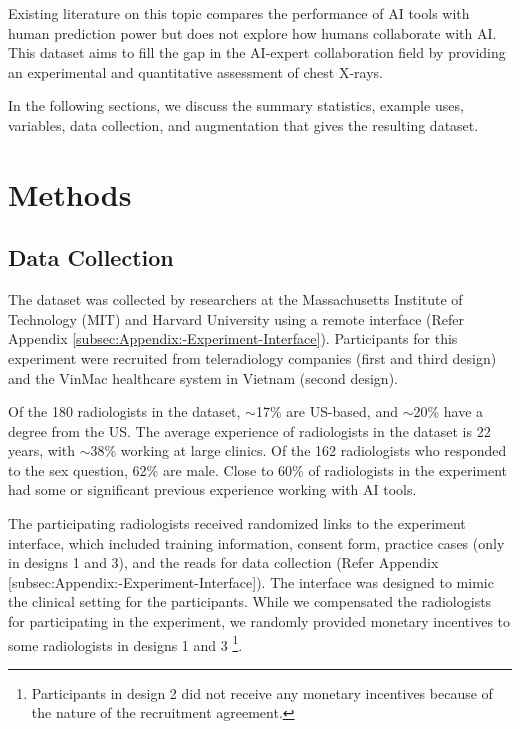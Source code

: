 \documentclass[fleqn,10pt]{wlscirep}
\begin{document}
Existing literature on this topic compares the performance of AI tools with human prediction power but does not explore how humans collaborate with AI. This dataset aims to fill the gap in the AI-expert collaboration field by providing an experimental and quantitative assessment of chest X-rays.

In the following sections, we discuss the summary statistics, example uses, variables, data collection, and augmentation that gives the resulting dataset. 



\section*{Methods}

\subsection*{Data Collection}

The dataset was collected by researchers at the Massachusetts Institute of Technology (MIT) and Harvard University using a remote interface (Refer Appendix \ref{subsec:Appendix:-Experiment-Interface}). Participants for this experiment were recruited from teleradiology companies (first and third design) and the VinMac healthcare system in Vietnam (second design).

Of the 180 radiologists in the dataset, $\sim$17\% are US-based, and $\sim$20\% have a degree from the US. The average experience of radiologists in the dataset is 22 years, with $\sim$38\% working at large clinics. Of the 162 radiologists who responded to the sex question, 62\% are male. Close to 60\% of radiologists in the experiment had some or significant previous experience working with AI tools. 

The participating radiologists received randomized links to the experiment interface, which included training information, consent form, practice cases (only in designs 1 and 3), and the reads for data collection (Refer Appendix [subsec:Appendix:-Experiment-Interface]). The interface was designed to mimic the clinical setting for the participants. While we compensated the radiologists for participating in the experiment, we randomly provided monetary incentives to some radiologists in designs 1 and 3 \footnote{Participants in design 2 did not receive any monetary incentives because of the nature of the recruitment agreement.}.
\end{document}
